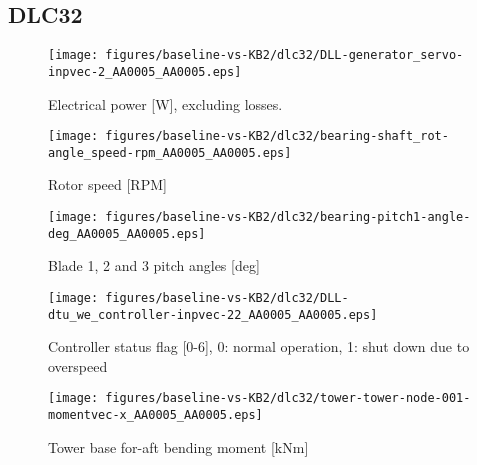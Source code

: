 
\subsection{DLC32}
\label{sec:baseline-vs-KB2:dlc32}

\begin{figure}[!ht]
\begin{center}
	\texttt{[image: figures/baseline-vs-KB2/dlc32/DLL-generator\_servo-inpvec-2\_AA0005\_AA0005.eps]}
\end{center}
\caption{Electrical power [W], excluding losses.}
\label{fig:baseline-vs-KB2:dlc32:power}
\end{figure}

\begin{figure}[!ht]
\begin{center}
	\texttt{[image: figures/baseline-vs-KB2/dlc32/bearing-shaft\_rot-angle\_speed-rpm\_AA0005\_AA0005.eps]}
\end{center}
\caption{Rotor speed [RPM]}
\label{fig:baseline-vs-KB2:dlc32:rpm}
\end{figure}

\begin{figure}[!ht]
\begin{center}
	\texttt{[image: figures/baseline-vs-KB2/dlc32/bearing-pitch1-angle-deg\_AA0005\_AA0005.eps]}
\end{center}
\caption{Blade 1, 2 and 3 pitch angles [deg]}
\label{fig:baseline-vs-KB2:dlc32:pitch}
\end{figure}

\begin{figure}[!ht]
\begin{center}
	\texttt{[image: figures/baseline-vs-KB2/dlc32/DLL-dtu\_we\_controller-inpvec-22\_AA0005\_AA0005.eps]}
\end{center}
\caption{Controller status flag [0-6], 0: normal operation, 1: shut down due to overspeed}
\label{fig:baseline-vs-KB2:dlc32:status}
\end{figure}

\begin{figure}[!ht]
\begin{center}
	\texttt{[image: figures/baseline-vs-KB2/dlc32/tower-tower-node-001-momentvec-x\_AA0005\_AA0005.eps]}
\end{center}
\caption{Tower base for-aft bending moment [kNm]}
\label{fig:baseline-vs-KB2:dlc32:tower-base-fa}
\end{figure}

